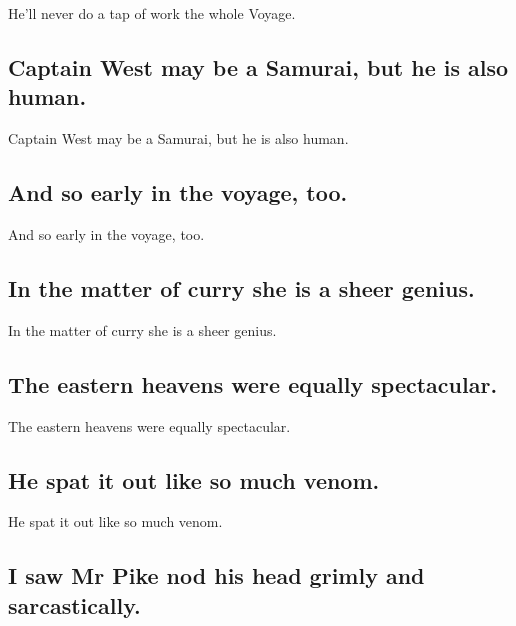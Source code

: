 \documentclass[]{article}
\begin{document}
He'll never do a tap of work the whole Voyage.

\hypertarget{captain-west-may-be-a-samurai-but-he-is-also-human.}{%
\subsection{Captain West may be a Samurai, but he is also
human.}\label{captain-west-may-be-a-samurai-but-he-is-also-human.}}

Captain West may be a Samurai, but he is also human.

\hypertarget{and-so-early-in-the-voyage-too.}{%
\subsection{And so early in the voyage,
too.}\label{and-so-early-in-the-voyage-too.}}

And so early in the voyage, too.

\hypertarget{in-the-matter-of-curry-she-is-a-sheer-genius.}{%
\subsection{In the matter of curry she is a sheer
genius.}\label{in-the-matter-of-curry-she-is-a-sheer-genius.}}

In the matter of curry she is a sheer genius.

\hypertarget{the-eastern-heavens-were-equally-spectacular.}{%
\subsection{The eastern heavens were equally
spectacular.}\label{the-eastern-heavens-were-equally-spectacular.}}

The eastern heavens were equally spectacular.

\hypertarget{he-spat-it-out-like-so-much-venom.}{%
\subsection{He spat it out like so much
venom.}\label{he-spat-it-out-like-so-much-venom.}}

He spat it out like so much venom.

\hypertarget{i-saw-mr-pike-nod-his-head-grimly-and-sarcastically.}{%
\subsection{I saw Mr Pike nod his head grimly and
sarcastically.}\label{i-saw-mr-pike-nod-his-head-grimly-and-sarcastically.}}
\end{document}

